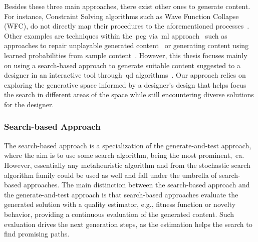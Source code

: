 Besides these three main approaches, there exist other ones to generate content. For instance, Constraint Solving algorithms such as Wave Function Collapse (WFC), do not directly map their procedures to the aforementioned processes~\cite{karth_wavefunctioncollapse_2017,karth_addressing_2019}. Other examples are techniques within the~\acrshort{pcg} via~\acrshort{ml} approach~\cite{summerville_procedural_2018} such as approaches to repair unplayable generated content~\cite{zhang_video_2020} or generating content using learned probabilities from sample content~\cite{dahlskog_multi-level_2014}. However, this thesis focuses mainly on using a search-based approach to generate suitable content suggested to a designer in an interactive tool through~\acrshort{qd} algorithms~\cite{gravina_procedural_2019}. Our approach relies on exploring the generative space informed by a designer's design that helps focus the search in different areas of the space while still encountering diverse solutions for the designer.





\subsubsection{Search-based Approach}

The search-based approach is a specialization of the generate-and-test approach, where the aim is to use some search algorithm, being the most prominent,~\acrlong{ea}. However, essentially any metaheuristic algorithm and from the stochastic search algorithm family could be used as well and fall under the umbrella of search-based approaches. The main distinction between the search-based approach and the generate-and-test approach is that search-based approaches evaluate the generated solution with a quality estimator, e.g., fitness function or novelty behavior, providing a continuous evaluation of the generated content. Such evaluation drives the next generation steps, as the estimation helps the search to find promising paths.

